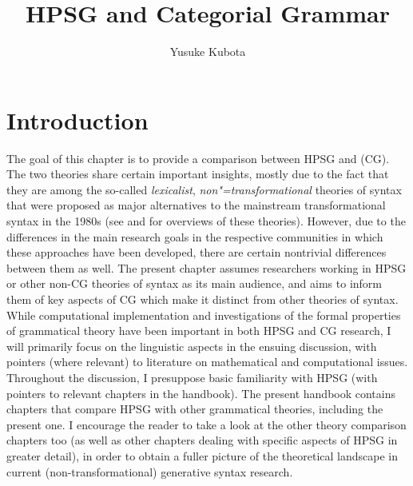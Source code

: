 \documentclass[output=paper
                ,modfonts
 	        ,biblatex
                ,babelshorthands
                ,newtxmath
                ,draftmode
                ,colorlinks, citecolor=brown
]{langscibook}
\author{Yusuke Kubota\affiliation{National Institute for Japanese Language and Linguistics}}
\title{HPSG and Categorial Grammar}
\begin{document}
\maketitle
\label{chap-cg}






\section{Introduction}

The goal of this chapter is to provide a comparison between HPSG and
 (CG). The two theories share certain important
insights, mostly due to the fact that they are among the so-called
\emph{lexicalist}, \emph{non"=transformational} theories of syntax that were
proposed as major alternatives to the mainstream transformational
syntax in the 1980s (see \citealt{BB2011a-ed} and \citealt{MuellerGT-Eng3}
for overviews of these 
theories). However, due to the differences in the main research goals
in the respective communities in which these approaches have been
developed, there are certain nontrivial differences between them as
well. The present chapter assumes researchers working in HPSG or other
non-CG theories of syntax as its main audience, and aims to inform
them of key aspects of CG which make it distinct from other theories
of syntax. While computational implementation and investigations of the
formal properties of grammatical theory have been important in both
HPSG and CG research, I will primarily focus on the linguistic aspects
in the ensuing discussion, with pointers (where relevant) to literature on mathematical
and computational issues. Throughout the discussion, I presuppose
basic familiarity with HPSG (with pointers to relevant chapters in the
handbook). The present handbook contains chapters that compare HPSG
with other grammatical theories, including the present one. I
encourage the reader to take a look at the other theory comparison
chapters too (as well as other chapters dealing with specific
aspects of HPSG in greater detail), in order to obtain a fuller picture of the
theoretical landscape in current (non-transformational) generative
syntax research.
\end{document}
